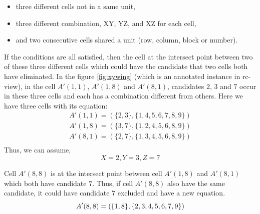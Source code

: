 \documentclass[11pt]{report}
\newcommand{\set}[1]{\{ #1 \}}
\begin{document}
\begin{itemize}
\item three different cells not in a same unit,
\item three different combination, XY, YZ, and XZ for each cell,
\item and two consecutive cells shared a unit (row, column, block or number).
\end{itemize}

If the conditions are all satisfied, then the cell at the intersect point between two of these three different cells which could have the candidate that two cells both have eliminated.
In the figure \ref{fig:xywing} (which is an annotated instance in rc-view), in the cell $A'(1,1)$, $A'(1,8)$ and $A'(8,1)$, candidates $2$, $3$ and $7$ occur in these three cells and each has a combination different from others. Here we have three cells with its equation:
\begin{eqnarray*}
A'(1,1) = (\set{2, 3}, \set{1, 4, 5, 6, 7, 8, 9})\\
A'(1,8) = (\set{3, 7}, \set{1, 2, 4, 5, 6, 8, 9})\\
A'(8,1) = (\set{2, 7}, \set{1, 3, 4, 5, 6, 8, 9})\\
\end{eqnarray*}
Thus, we can assume,
\begin{displaymath}
X = 2, Y = 3, Z = 7
\end{displaymath}

Cell $A'(8,8)$ is at the intersect point between cell $A'(1,8)$ and $A'(8,1)$ which both have candidate $7$. Thus, if cell $A'(8,8)$ also have the same candidate, it could have candidate $7$ excluded and have a new equation.
\begin{displaymath}
A'(8,8) = (\set{1, 8}, \set{2, 3, 4, 5, 6, 7, 9})\\
\end{displaymath}
\end{document}
